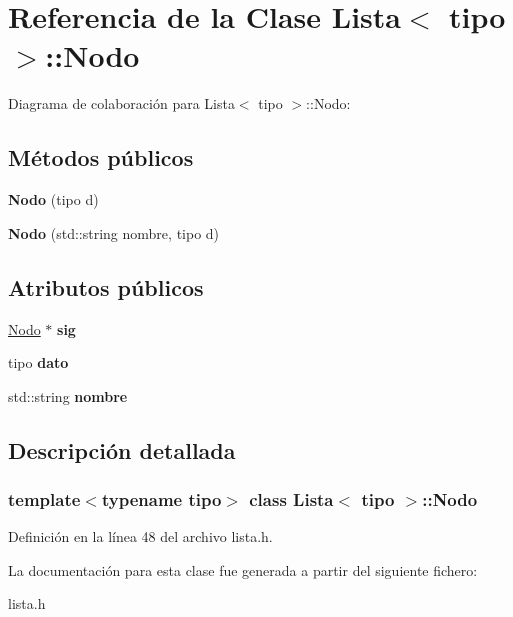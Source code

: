 \hypertarget{classLista_1_1Nodo}{}\section{Referencia de la Clase Lista$<$ tipo $>$\+:\+:Nodo}
\label{classLista_1_1Nodo}


Diagrama de colaboración para Lista$<$ tipo $>$\+:\+:Nodo\+:
\subsection*{Métodos públicos}
\begin{DoxyCompactItemize}
\item 
\mbox{\label{classLista_1_1Nodo_a76d93da356c9904873c409f413737e58}} 
{\bfseries Nodo} (tipo d)
\item 
\mbox{\label{classLista_1_1Nodo_a0ab9f1e824afe00a532fabf20ffc2607}} 
{\bfseries Nodo} (std\+::string nombre, tipo d)
\end{DoxyCompactItemize}
\subsection*{Atributos públicos}
\begin{DoxyCompactItemize}
\item 
\mbox{\label{classLista_1_1Nodo_a8594ea833e1be652cb7a9b8be66bf97d}} 
\hyperlink{classLista_1_1Nodo}{Nodo} $\ast$ {\bfseries sig}
\item 
\mbox{\label{classLista_1_1Nodo_ae3e8f0073984b0791ba94590ea9e2c9f}} 
tipo {\bfseries dato}
\item 
\mbox{\label{classLista_1_1Nodo_ab6ad6f5015b5e8acd5f82ca3701eb804}} 
std\+::string {\bfseries nombre}
\end{DoxyCompactItemize}


\subsection{Descripción detallada}
\subsubsection*{template$<$typename tipo$>$\newline
class Lista$<$ tipo $>$\+::\+Nodo}



Definición en la línea 48 del archivo lista.\+h.



La documentación para esta clase fue generada a partir del siguiente fichero\+:\begin{DoxyCompactItemize}
\item 
lista.\+h\end{DoxyCompactItemize}

